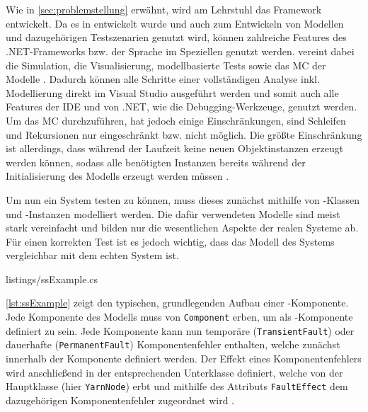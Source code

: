 \section{\sS}\label{sec:sSharp}

Wie in \autoref{sec:problemstellung} erwähnt, wird am Lehrstuhl das Framework \sS entwickelt. Da es in \cS entwickelt wurde und \cS auch zum Entwickeln von Modellen und dazugehörigen Testszenarien genutzt wird, können zahlreiche Features des .NET-Frameworks bzw. der Sprache \cS im Speziellen genutzt werden. \sS vereint dabei die Simulation, die Visualisierung, modellbasierte Tests sowie das MC der Modelle \cite{Habermaier2015,Habermaier2016}. Dadurch können alle Schritte einer vollständigen Analyse inkl. Modellierung direkt im Visual Studio ausgeführt werden und somit auch alle Features der IDE und von .NET, wie \zB die Debugging-Werkzeuge, genutzt werden. Um das MC durchzuführen, hat \sS jedoch einige Einschränkungen, \uA sind Schleifen und Rekursionen nur eingeschränkt bzw. nicht möglich. Die größte Einschränkung ist allerdings, dass während der Laufzeit keine neuen Objektinstanzen erzeugt werden können, sodass alle benötigten Instanzen bereits während der Initialisierung des Modells erzeugt werden müssen \cite{Habermaier2015}.

Um nun ein System testen zu können, muss dieses zunächst mithilfe von \cS-Klassen und -Instanzen modelliert werden. Die dafür verwendeten Modelle sind meist stark vereinfacht und bilden nur die wesentlichen Aspekte der realen Systeme ab. Für einen korrekten Test ist es jedoch wichtig, dass das Modell des Systems vergleichbar mit dem echten System ist.


{listings/ssExample.cs}

\autoref{lst:ssExample} zeigt den typischen, grundlegenden Aufbau einer \sS-Komponente. Jede Komponente des Modells muss von \texttt{Component} erben, um als \sS-Komponente definiert zu sein. Jede Komponente kann nun temporäre (\texttt{TransientFault}) oder dauerhafte (\texttt{PermanentFault}) Komponentenfehler enthalten, welche zunächst innerhalb der Komponente definiert werden. Der Effekt eines Komponentenfehlers wird anschließend in der entsprechenden Unterklasse definiert, welche von der Hauptklasse (hier \texttt{YarnNode}) erbt und mithilfe des Attributs \texttt{FaultEffect} dem dazugehörigen Komponentenfehler zugeordnet wird \cite{Habermaier2016}.

